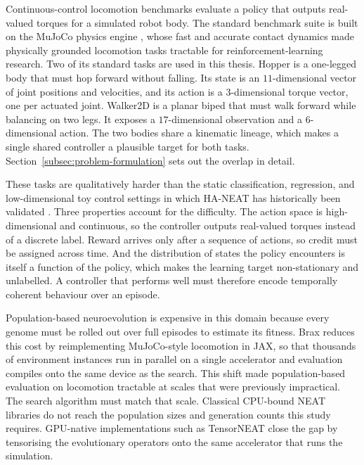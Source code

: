 \documentclass[12pt]{article}
\newcommand{\revPlain}[2]{#2}
\begin{document}

Continuous-control locomotion benchmarks evaluate a policy that outputs real-valued torques for a simulated robot body.
The standard benchmark suite \parencite{brockman_openai_2016,duan_benchmarking_2016} is built on the MuJoCo physics engine \parencite{todorov_mujoco_2012}, whose fast and accurate contact dynamics made physically grounded locomotion tasks tractable for reinforcement-learning research.
\revPlain{P-08}{Two of its standard tasks are used in this thesis.}
Hopper is a one-legged body that must hop forward without falling. Its state is an $11$-dimensional vector of joint positions and velocities, and its action is a $3$-dimensional torque vector, one per actuated joint.
Walker2D is a planar biped that must walk forward while balancing on two legs. It exposes a $17$-dimensional observation and a $6$-dimensional action.
The two bodies share a kinematic lineage, which makes a single shared controller a plausible target for both tasks. Section~\ref{subsec:problem-formulation} sets out the overlap in detail.

These tasks are qualitatively harder than the static classification, regression, and low-dimensional toy control settings in which HA-NEAT has historically been validated \parencite{hagg_evolving_2017}.
Three properties account for the difficulty.
The action space is high-dimensional and continuous, so the controller outputs real-valued torques instead of a discrete label.
Reward arrives only after a sequence of actions, so credit must be assigned across time.
And the distribution of states the policy encounters is itself a function of the policy, which makes the learning target non-stationary and unlabelled.
A controller that performs well must therefore encode temporally coherent behaviour over an episode.

Population-based neuroevolution is expensive in this domain because every genome must be rolled out over full episodes to estimate its fitness.
Brax \parencite{freeman_brax_2021} reduces this cost by reimplementing MuJoCo-style locomotion in JAX, so that thousands of environment instances run in parallel on a single accelerator and evaluation compiles onto the same device as the search.
This shift made population-based evaluation on locomotion tractable at scales that were previously impractical.
The search algorithm must match that scale.
Classical CPU-bound NEAT libraries do not reach the population sizes and generation counts this study requires.
GPU-native implementations such as TensorNEAT \parencite{wang_tensorized_2024} close the gap by tensorising the evolutionary operators onto the same accelerator that runs the simulation.
\end{document}
